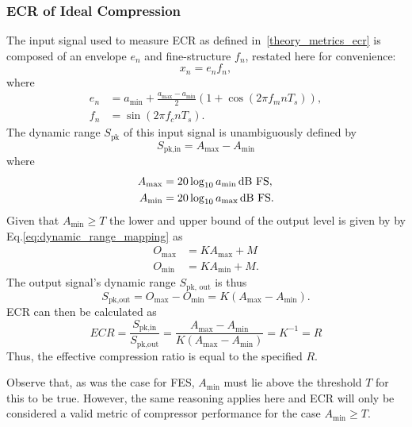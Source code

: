 \documentclass[../main2.tex]{subfiles}
\begin{document}
\subsubsection{ECR of Ideal Compression}
The input signal used to measure ECR as defined in~\ref{theory_metrics_ecr} is composed of an envelope $e_n$ and fine-structure $f_n$, restated here for convenience:
\begin{equation}
x_n = e_n f_n,
\end{equation}
where
\begin{equation}
\begin{split}
	e_n &= a_\text{min} + \frac{a_\text{max}- a_\text{min}}{2} \left(1 + \cos(2 \pi f_m n T_s) \right), \\
	f_n &= \sin(2 \pi f_c n T_s).
\end{split}
\end{equation}
The dynamic range $S_\text{pk}$ of this input signal is unambiguously defined by
\begin{equation}
S_\text{pk,in} = A_\text{max} - A_\text{min}
\end{equation}
where
\begin{equation}
\begin{split}
A_\text{max} &= 20 \log_{10} a_\text{min} \mskip3mu\text{dB FS}, \\
A_\text{min} &= 20 \log_{10} a_\text{max} \mskip3mu\text{dB FS}.
\end{split}
\end{equation}
Given that $A_\text{min} \geq T$ the lower and upper bound of the output level is given by by Eq.\eqref{eq:dynamic_range_mapping} as
\begin{equation}
\begin{split}
O_\text{max} &= K A_\text{max} + M\\
O_\text{min} &= K A_\text{min} + M.
\end{split}
\end{equation}
The output signal's dynamic range $S_\text{pk, out}$ is thus
\begin{equation}
S_\text{pk,out} = O_\text{max} - O_\text{min} = K (A_\text{max} - A_\text{min}).\end{equation}
ECR can then be calculated as
\begin{equation}
ECR = \frac{S_\text{pk,in}}{S_\text{pk,out}} = \frac{A_\text{max} - A_\text{min}}{K(A_\text{max} - A_\text{min})} = K^{-1} = R
\end{equation}
Thus, the effective compression ratio is equal to the specified $R$.

Observe that, as was the case for FES, $A_\text{min}$ must lie above the threshold $T$ for this to be true. However, the same reasoning applies here and ECR will only be considered a valid metric of compressor performance for the case $A_\text{min} \geq T$.
\end{document}
